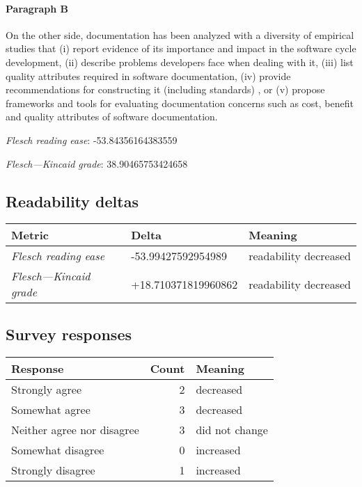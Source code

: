\paragraph{Paragraph B}
On the other side, documentation has been analyzed with a diversity of empirical studies that (i) report evidence of its importance and impact in the software cycle development, (ii) describe problems developers face when dealing with it, (iii) list quality attributes required in software documentation, (iv) provide recommendations for constructing it (including standards) , or (v) propose frameworks and tools for evaluating documentation concerns such as cost, benefit and quality attributes of software documentation.\par\medskip\emph{Flesch reading ease}: -53.84356164383559\par\emph{Flesch---Kincaid grade}: 38.90465753424658

\subsection{Readability deltas}

\begin{tabular}{lll}
\toprule
               \textbf{Metric} &       \textbf{Delta} &       \textbf{Meaning} \\
\midrule
    \emph{Flesch reading ease} &   -53.99427592954989 &  readability decreased \\
 \emph{Flesch---Kincaid grade} &  +18.710371819960862 &  readability decreased \\
\bottomrule
\end{tabular}

\subsection{Survey responses}
\begin{tabular}{lrl}
\toprule
          \textbf{Response} &  \textbf{Count} & \textbf{Meaning} \\
\midrule
             Strongly agree &               2 &        decreased \\
             Somewhat agree &               3 &        decreased \\
 Neither agree nor disagree &               3 &   did not change \\
          Somewhat disagree &               0 &        increased \\
          Strongly disagree &               1 &        increased \\
\bottomrule
\end{tabular}

